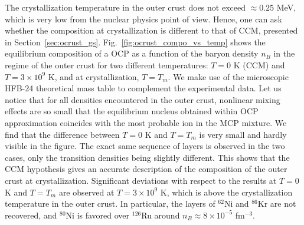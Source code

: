 The crystallization temperature in the outer crust does not exceed $\approx
0.25$ MeV, which is very low from the nuclear physics point of view. Hence, one
can ask whether the composition at crystallization is different to that of
CCM, presented in Section~\ref{sec:ocrust_gs}.
Fig.~\ref{fig:ocrust_compo_vs_temp} shows the equilibrium composition of a OCP
as a function of the baryon density $n_B$ in the regime of the outer crust for
two different temperatures: $T=0$ K (CCM) and $T=3\times 10^9$ K, and at 
crystallization, $T=T_m$. We make use of the microscopic HFB-24 theoretical 
mass table to complement the experimental data.
Let us notice that for all densities encountered in the outer crust, nonlinear 
mixing effects are so small that the equilibrium nucleus obtained within OCP 
approximation coincides with the most probable ion in the MCP mixture.
We find that the difference between $T=0$ K and $T=T_m$ is very small and 
hardly visible in the figure. The exact same sequence of layers is observed in 
the two cases, only the transition densities being slightly different.
This shows that the CCM hypothesis gives an accurate description of the 
composition of the outer crust at crystallization.
Significant deviations with respect to the results at $T=0$ K and $T=T_m$ are 
observed at $T=3\times 10^9$ K, which is above the crystallization temperature
in the outer crust. In particular, the layers of $^{62}$Ni and $^{86}$Kr are 
not recovered, and $^{80}$Ni is favored over $^{126}$Ru around $n_B \approx 
8\times 10^{-5}$ fm$^{-3}$.

